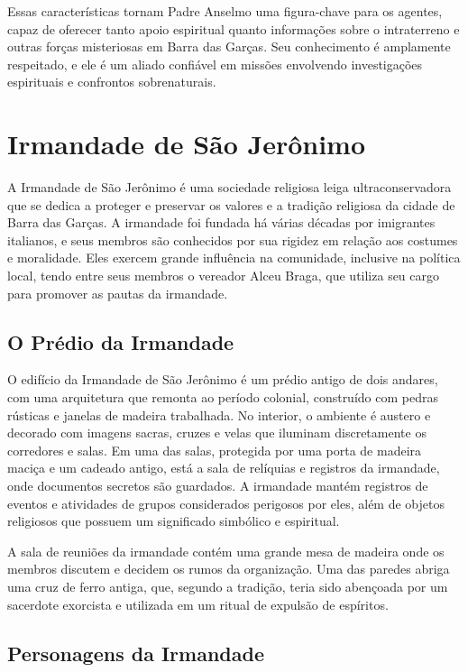 Essas características tornam Padre Anselmo uma figura-chave para os agentes, capaz de oferecer tanto apoio espiritual quanto informações sobre o intraterreno e outras forças misteriosas em Barra das Garças. Seu conhecimento é amplamente respeitado, e ele é um aliado confiável em missões envolvendo investigações espirituais e confrontos sobrenaturais.





\section{Irmandade de São Jerônimo}

A Irmandade de São Jerônimo é uma sociedade religiosa leiga ultraconservadora que se dedica a proteger e preservar os valores e a tradição religiosa da cidade de Barra das Garças. A irmandade foi fundada há várias décadas por imigrantes italianos, e seus membros são conhecidos por sua rigidez em relação aos costumes e moralidade. Eles exercem grande influência na comunidade, inclusive na política local, tendo entre seus membros o vereador Alceu Braga, que utiliza seu cargo para promover as pautas da irmandade.

\subsection{O Prédio da Irmandade}

O edifício da Irmandade de São Jerônimo é um prédio antigo de dois andares, com uma arquitetura que remonta ao período colonial, construído com pedras rústicas e janelas de madeira trabalhada. No interior, o ambiente é austero e decorado com imagens sacras, cruzes e velas que iluminam discretamente os corredores e salas. Em uma das salas, protegida por uma porta de madeira maciça e um cadeado antigo, está a sala de relíquias e registros da irmandade, onde documentos secretos são guardados. A irmandade mantém registros de eventos e atividades de grupos considerados perigosos por eles, além de objetos religiosos que possuem um significado simbólico e espiritual.

A sala de reuniões da irmandade contém uma grande mesa de madeira onde os membros discutem e decidem os rumos da organização. Uma das paredes abriga uma cruz de ferro antiga, que, segundo a tradição, teria sido abençoada por um sacerdote exorcista e utilizada em um ritual de expulsão de espíritos.

\subsection{Personagens da Irmandade}

